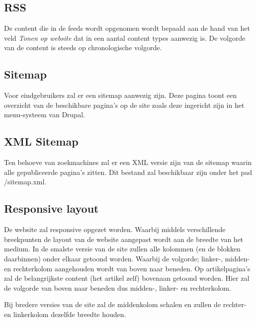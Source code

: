 \subsection{RSS}
De content die in de feeds wordt opgenomen wordt bepaald aan de hand van het veld \emph{Tonen op website} dat in een aantal content types aanwezig is. De volgorde van de content is steeds op chronologische volgorde.

\subsection{Sitemap}
Voor eindgebruikers zal er een sitemap aanwezig zijn. Deze pagina toont een overzicht van de beschikbare pagina's op de site zoals deze ingericht zijn in het menu-systeem van Drupal.

\subsection{XML Sitemap}
Ten behoeve van zoekmachines zal er een XML versie zijn van de sitemap waarin alle gepubliceerde pagina's zitten. Dit bestand zal beschikbaar zijn onder het pad /sitemap.xml.

\subsection{Responsive layout}
De website zal responsive opgezet worden. Waarbij middels verschillende breekpunten de layout van de website aangepast wordt aan de breedte van het medium. In de smalste versie van de site zullen alle kolommen (en de blokken daarbinnen) onder elkaar getoond worden. Waarbij de volgorde; linker-, midden- en rechterkolom aangehouden wordt van boven naar beneden. Op artikelpagina's zal de belangrijkste content (het artikel zelf) bovenaan getoond worden. Hier zal de volgorde van boven naar beneden dus midden-, linker- en rechterkolom.

Bij bredere versies van de site zal de middenkolom schalen en zullen de rechter- en linkerkolom dezelfde breedte houden.